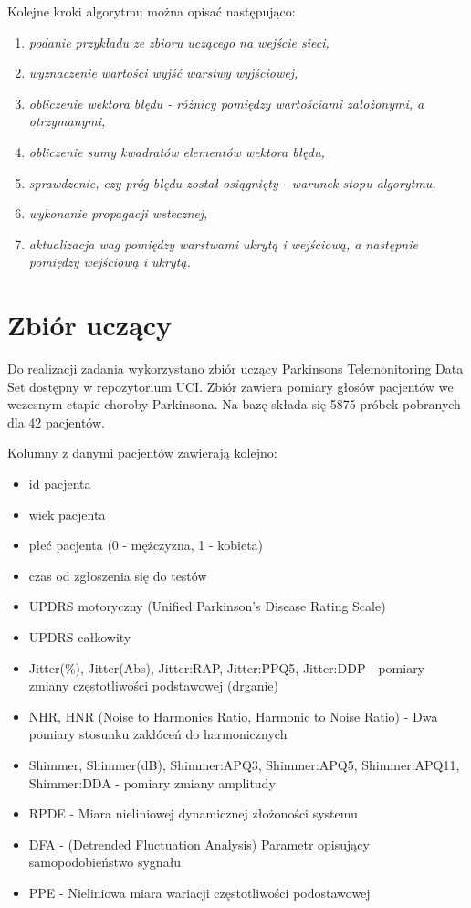 \documentclass[12pt]{article}
\begin{document}
Kolejne kroki algorytmu można opisać następująco:

\begin{enumerate}

\item \textsl{podanie przykładu ze zbioru uczącego na wejście sieci,}

\item \textsl{wyznaczenie wartości wyjść warstwy wyjściowej,}

\item \textsl{obliczenie wektora błędu - różnicy pomiędzy wartościami założonymi, a otrzymanymi,}

\item \textsl{obliczenie sumy kwadratów elementów wektora błędu,}

\item \textsl{sprawdzenie, czy próg błędu został osiągnięty - warunek stopu algorytmu,}

\item \textsl{wykonanie propagacji wstecznej,}

\item \textsl{aktualizacja wag pomiędzy warstwami ukrytą i wejściową, a następnie pomiędzy wejściową i ukrytą.}

\end{enumerate}

\newpage
\section{Zbiór uczący}

Do realizacji zadania wykorzystano zbiór uczący Parkinsons Telemonitoring Data Set dostępny w repozytorium UCI. Zbiór zawiera pomiary głosów pacjentów we wczesnym etapie choroby Parkinsona. Na bazę składa się 5875 próbek pobranych dla 42 pacjentów.

Kolumny z danymi pacjentów zawierają kolejno:
\begin{itemize}
	\item id pacjenta
	\item wiek pacjenta
	\item płeć pacjenta (0 - mężczyzna, 1 - kobieta)
	\item czas od zgłoszenia się do testów
	\item UPDRS motoryczny (Unified Parkinson's Disease Rating Scale)
	\item UPDRS całkowity
	\item Jitter(\%), Jitter(Abs), Jitter:RAP, Jitter:PPQ5, Jitter:DDP - pomiary zmiany częstotliwości podstawowej (drganie)
	\item NHR, HNR (Noise to Harmonics Ratio, Harmonic to Noise Ratio) -  Dwa pomiary stosunku zakłóceń do harmonicznych
	\item Shimmer, Shimmer(dB), Shimmer:APQ3, Shimmer:APQ5, Shimmer:APQ11, Shimmer:DDA - pomiary zmiany amplitudy
	\item RPDE - Miara nieliniowej dynamicznej złożoności systemu
	\item DFA - (Detrended Fluctuation Analysis) Parametr opisujący samopodobieństwo sygnału
	\item PPE - Nieliniowa miara wariacji częstotliwości podostawowej
\end{itemize}
\end{document}
